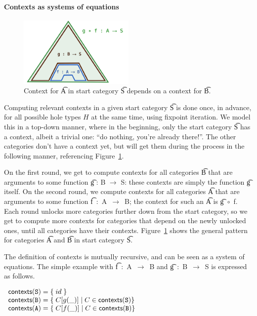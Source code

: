 \paragraph{Contexts as systems of equations}

\begin{figure}[h]
\centering
\includegraphics[width=0.5\textwidth]{img/contexts-dependence.png}
\caption{Context for \t{A} in start
  category \t{S} depends on a context for \t{B}.}
\label{fig:context-dependence}
\end{figure}

Computing relevant contexts in a given start category \t{S} is done
once, in advance, for all possible hole types $H$ at the same time,
using fixpoint iteration.
We model this in a top-down manner, where in the beginning, only the
start category \t{S} has a context, albeit a trivial one: ``do
nothing, you're already there!''. The other categories don't have a
context yet, but will get them during the process in the following
manner, referencing Figure~\ref{fig:context-dependence}.

On the first round, we get to compute contexts for all categories
\t{B} that are arguments to some function \t{g : B $\rightarrow$ S}:
these contexts are simply the function \t{g} itself. On the second
round, we compute contexts for all categories \t{A} that are arguments
to some function \t{f~:~A~$\rightarrow$~B}; the context for such an
\t{A} is \t{g~$\circ$~f}. Each round unlocks more categories further
down from the start category, so we get to compute more contexts for
categories that depend on the newly unlocked ones, until all
categories have their contexts. Figure~\ref{fig:context-dependence}
shows the general pattern for categories \t{A} and \t{B} in start
category \t{S}.

The definition of contexts is mutually recursive, and can be seen as a
system of equations. The simple example with \t{f~:~A~$\rightarrow$~B}
and \t{g~:~B~$\rightarrow$~S} is expressed as follows.


\begin{EmptyItem}
$\begin{array}{l @{\hspace{0.1cm}} l}
\textsf{contexts}(\t{S}) = & \{ \; id \; \} \\
\textsf{contexts}(\t{B}) = &  \{ \; C[g(\_)] \; | \; C \in
                             \textsf{contexts}(\t{S}) \} \\
\textsf{contexts}(\t{A}) = &  \{ \; C[f(\_)] \; | \; C \in
                             \textsf{contexts}(\t{B}) \} \\

\end{array}$
\end{EmptyItem}


